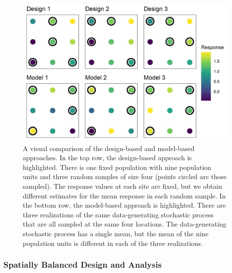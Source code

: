 \documentclass[]{elsarticle} %
\begin{document}
\begin{figure}
  \centering
  \includegraphics[width = 1\linewidth]{figures/dvm_comp.jpeg}
  \caption{A visual comparison of the design-based and model-based approaches. In the top row, the design-based approach is highlighted. There is one fixed population with nine population units and three random samples of size four (points circled are those sampled). The response values at each site are fixed, but we obtain different estimates for the mean response in each random sample. In the bottom row, the model-based approach is highlighted. There are three realizations of the same data-generating stochastic process that are all sampled at the same four locations. The data-generating stochastic process has a single mean, but the mean of the nine population units is different in each of the three realizations.}
  \label{fig:fig1}
\end{figure}

\hypertarget{subsec:spb_design}{%
\subsubsection{Spatially Balanced Design and
Analysis}\label{subsec:spb_design}}
\end{document}
